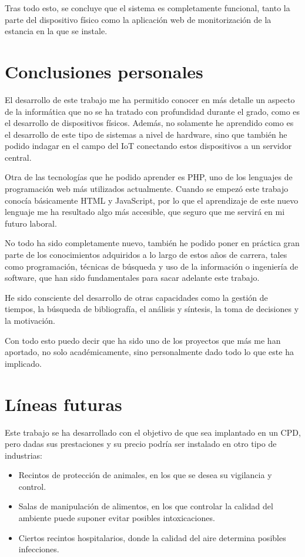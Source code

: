 Tras todo esto, se concluye que el sistema es completamente funcional, tanto la parte del dispositivo físico como la aplicación web de monitorización de la estancia en la que se instale.

\section{Conclusiones personales}\label{sec:conclusiones-personales}
El desarrollo de este trabajo me ha permitido conocer en más detalle un aspecto de la informática que no se ha tratado con profundidad durante el grado, como es el desarrollo de dispositivos físicos. Además, no solamente he aprendido como es el desarrollo de este tipo de sistemas a nivel de hardware, sino que también he podido indagar en el campo del IoT conectando estos dispositivos a un servidor central.

Otra de las tecnologías que he podido aprender es PHP, uno de los lenguajes de programación web más utilizados actualmente. Cuando se empezó este trabajo conocía básicamente HTML y JavaScript, por lo que el aprendizaje de este nuevo lenguaje me ha resultado algo más accesible, que seguro que me servirá en mi futuro laboral.

No todo ha sido completamente nuevo, también he podido poner en práctica gran parte de los conocimientos adquiridos a lo largo de estos años de carrera, tales como programación, técnicas de búsqueda y uso de la información o ingeniería de software, que han sido fundamentales para sacar adelante este trabajo.

He sido consciente del desarrollo de otras capacidades como la gestión de tiempos, la búsqueda de bibliografía, el análisis y síntesis, la toma de decisiones y la motivación.

Con todo esto puedo decir que ha sido uno de los proyectos que más me han aportado, no solo académicamente, sino personalmente dado todo lo que este ha implicado.

\section{Líneas futuras}\label{sec:líneas-futuras}
Este trabajo se ha desarrollado con el objetivo de que sea implantado en un CPD, pero dadas sus prestaciones y su precio podría ser instalado en otro tipo de industrias:
\begin{itemize}
	\item Recintos de protección de animales, en los que se desea su vigilancia y control.
	\item Salas de manipulación de alimentos, en los que controlar la calidad del ambiente puede suponer evitar posibles  intoxicaciones.
	\item Ciertos recintos hospitalarios, donde la calidad del aire determina posibles infecciones.
\end{itemize}

